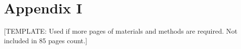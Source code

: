 \chapter*{Appendix I}

[TEMPLATE: Used if more pages of materials and methods are required. Not included in 85 pages count.]